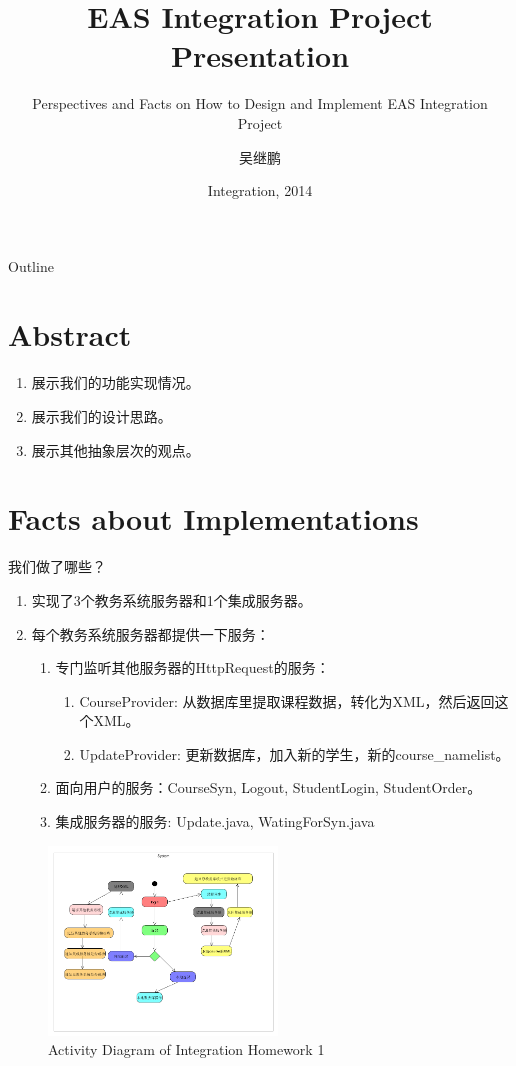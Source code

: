 ﻿\documentclass{beamer}
\title[Assignment 4] 
{EAS Integration Project Presentation}
\subtitle
{Perspectives and Facts on How to Design and Implement EAS Integration Project}
\author[Author] 
{吴继鹏}
\institute[Universities of Somewhere and Elsewhere] 
{
  Software Institute\\
  Nanjing University
}
\date[Integration 2014]
{Integration, 2014}
\begin{document}
\begin{frame}
  \titlepage
\end{frame}

\begin{frame}{Outline}
  \tableofcontents
\end{frame}

\section{Abstract}
\begin{frame}
\begin{enumerate}
\item 展示我们的功能实现情况。
\item 展示我们的设计思路。
\item 展示其他抽象层次的观点。
\end{enumerate}
\end{frame}


\section{Facts about Implementations}
\begin{frame}
  我们做了哪些？
\begin{enumerate}
\item 实现了3个教务系统服务器和1个集成服务器。\pause
\item 每个教务系统服务器都提供一下服务：\pause
  \begin{enumerate}
  \item 专门监听其他服务器的HttpRequest的服务：\pause
    \begin{enumerate}
    \item CourseProvider: 从数据库里提取课程数据，转化为XML，然后返回这个XML。\pause
    \item UpdateProvider: 更新数据库，加入新的学生，新的course\_namelist。\pause
    \end{enumerate}
  \item 面向用户的服务：CourseSyn, Logout, StudentLogin, StudentOrder。\pause
  \item 集成服务器的服务: Update.java, WatingForSyn.java \pause
  \end{enumerate}
\end{enumerate}
\end{frame}


\begin{frame}
  \begin{figure}
    \includegraphics[width=2.4in]{img/1.PNG}
    \caption{Activity Diagram of Integration Homework 1}
  \end{figure}
\end{frame}
\end{document}
